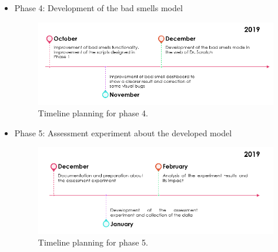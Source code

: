 \begin{itemize}
    \item Phase 4: Development of the bad smells model 
    
    \begin{figure}[h]
    \centering
        \includegraphics[width=12cm, keepaspectratio]{img/phase_4.png}
        \caption{Timeline planning for phase 4.}
        \label{fig:phase_4}
    \end{figure}
    
    \item Phase 5: Assessment experiment about the developed model
    
    \begin{figure}[h]
    \centering
        \includegraphics[width=12cm, keepaspectratio]{img/phase_5.png}
        \caption{Timeline planning for phase 5.}
        \label{fig:phase_5}
    \end{figure}
    
\end{itemize}
